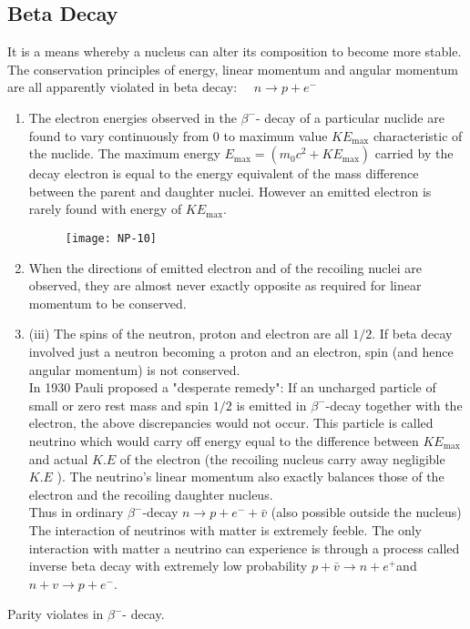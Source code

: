 \subsection{Beta Decay}
It is a means whereby a nucleus can alter its composition to become more stable. The conservation principles of energy, linear momentum and angular momentum are all apparently violated in beta decay: $\quad n \rightarrow p+e^{-}$\\
\begin{enumerate}[label=\roman*)]
	\item  The electron energies observed in the $\beta^{-}$- decay of a particular nuclide are found to vary continuously from 0 to maximum value $K E_{\max }$ characteristic of the nuclide. The maximum energy $E_{\max }=\left(m_0 c^2+K E_{\max }\right)$ carried by the decay electron is equal to the energy equivalent of the mass difference between the parent and daughter nuclei. However an emitted electron is rarely found with energy of $K E_{\max }$.
	\begin{figure}[H]
		\centering
		\texttt{[image: NP-10]}
		\caption{}
		\label{}
	\end{figure}
\item  When the directions of emitted electron and of the recoiling nuclei are observed, they are almost never exactly opposite as required for linear momentum to be conserved.
\item (iii) The spins of the neutron, proton and electron are all $1 / 2$. If beta decay involved just a neutron becoming a proton and an electron, spin (and hence angular momentum) is not conserved.\\
In 1930 Pauli proposed a "desperate remedy": If an uncharged particle of small or zero rest mass and spin $1 / 2$ is emitted in $\beta^{-}$-decay together with the electron, the above discrepancies would not occur. This particle is called neutrino which would carry off energy equal to the difference between $K E_{\max }$ and actual $K . E$ of the electron (the recoiling nucleus carry away negligible $K . E$ ). The neutrino's linear momentum also exactly balances those of the electron and the recoiling daughter nucleus.\\
Thus in ordinary $\beta^{-}$-decay $n \rightarrow p+e^{-}+\bar{v}$ (also possible outside the nucleus)\\
The interaction of neutrinos with matter is extremely feeble. The only interaction with matter a neutrino can experience is through a process called inverse beta decay with extremely low probability $p+\bar{v} \rightarrow n+e^{+}$and $n+v \rightarrow p+e^{-}$.
\end{enumerate}
\begin{note}
	Parity violates in $\beta^{-}$- decay.
\end{note}
